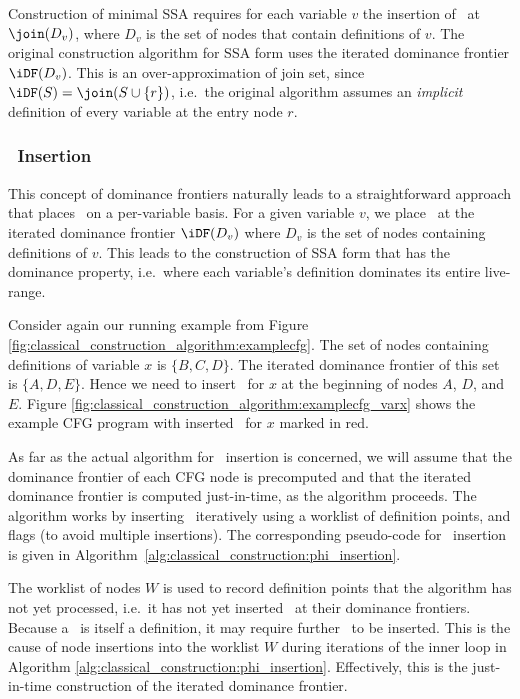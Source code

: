 Construction of minimal SSA 
requires for each variable $v$ the insertion of \phifuns\ at $\join(D_v)$,
where $D_v$ is the set of nodes that contain definitions of $v$.
The original construction algorithm
for SSA form uses the iterated dominance frontier $\iDF(D_v)$.
This is an over-approximation of join set, since
$\iDF(S)=\join(S\cup \{r\})$,
i.e.\ the original algorithm assumes an \emph{implicit} definition of every
variable at the entry node $r$.


\subsubsection*{\phifun\ Insertion}

This concept of dominance frontiers 
naturally leads to a
straightforward approach that places \phifuns\
on a per-variable basis.
For a given variable $v$, we place \phifuns\ at the
iterated dominance frontier $\iDF(D_v)$ where
$D_v$ is the set of nodes containing definitions of $v$.
This leads to the construction of SSA form that has 
the dominance property, i.e.\ where each variable's definition dominates its entire live-range.

Consider again our running example from Figure 
\ref{fig:classical_construction_algorithm:examplecfg}. The set of nodes containing definitions
of variable
$x$ is $\{ B,C,D \}$. The iterated dominance frontier of this set
is $\{ A, D, E \}$. Hence we need to insert 
\phifuns\ for $x$ at the beginning of nodes $A$, $D$, and $E$.
Figure \ref{fig:classical_construction_algorithm:examplecfg_varx} shows the example CFG program
with inserted \phifuns\ for $x$ marked in red.



As far as the actual algorithm for \phifuns\ insertion
is concerned, we will assume that the dominance
frontier of each CFG node is precomputed and that the iterated dominance frontier is computed just-in-time, as the algorithm proceeds.
The algorithm works by inserting \phifuns\ iteratively
using a worklist of definition points, and flags (to avoid multiple
insertions). The corresponding pseudo-code for
\phifun\ insertion is given in
Algorithm~\ref{alg:classical_construction:phi_insertion}.


The worklist of nodes $W$ is used to record definition points that the
algorithm
has not yet processed, i.e.\ it has not yet inserted \phifuns\ at their dominance
frontiers.
Because a \phifun\ is itself a 
definition, it may require further \phifuns\ to be inserted.
This is the cause of node insertions into the worklist $W$ during
iterations of the inner loop in Algorithm 
\ref{alg:classical_construction:phi_insertion}.
Effectively, this is the just-in-time construction of
the iterated dominance frontier.


